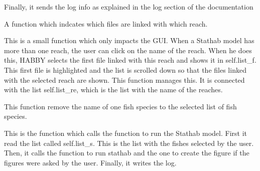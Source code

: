 \documentclass[letterpaper,10pt,english]{sphinxmanual}
\begin{document}
\begin{fulllineitems}
\begin{fulllineitems}
Finally, it sends the log info as explained in the log section of the documentation

\end{fulllineitems}


\begin{fulllineitems}
\label{\detokenize{index:src_GUI.stathab_GUI.StathabW.reach_selected}}
A function which indcates which files are linked with which reach.


This is a small function which only impacts the GUI. When a Stathab model has more than one reach,
the user can click on the name of the reach. When he does this, HABBY selects the first file linked
with this reach and shows it in self.list\_f. This first file is highlighted and the list is scrolled
down so that the files linked with the selected reach are shown. This function manages this. It is connected
with the list self.list\_re, which is the list with the name of the reaches.

\end{fulllineitems}


\begin{fulllineitems}
\label{\detokenize{index:src_GUI.stathab_GUI.StathabW.remove_fish}}
This function remove the name of one fish species to the selected list of fish species.

\end{fulllineitems}


\begin{fulllineitems}
\label{\detokenize{index:src_GUI.stathab_GUI.StathabW.run_stathab_gui}}
This is the function which calls the function to run the Stathab model.  First it read the list called
self.list\_s. This is the list with the fishes selected by the user. Then, it calls the function to run
stathab and the one to create the figure if the figures were asked by the user. Finally, it writes the log.

\end{fulllineitems}


\end{fulllineitems}
\end{document}
